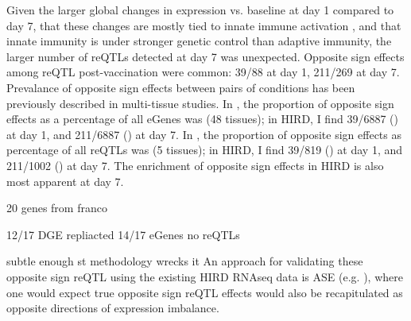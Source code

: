 Given the larger  global changes in expression vs. baseline at day 1 compared to day 7, 
that these changes are mostly tied to innate immune activation ,
and that innate immunity is under stronger genetic control than adaptive immunity\autocite{patin2018NaturalVariationParameters},
the larger number of \glspl{reQTL} detected at day 7 was unexpected.
Opposite sign effects among \gls{reQTL} post-vaccination were common: 39/88 at day 1, 211/269 at day 7.
Prevalance of opposite sign effects between pairs of conditions has been previously described in multi-tissue studies.
In \autocite{mizuno2019BiologicalCharacterizationExpression}, the proportion of opposite sign effects as a percentage of all eGenes was  (48 tissues);
in \gls{HIRD}, I find
39/6887 () at day 1,
and 211/6887 () at day 7.
In \autocite{fu2012UnravelingRegulatoryMechanisms}, the proportion of opposite sign effects as percentage of all reQTLs was  (5 tissues);
in \gls{HIRD}, I find
39/819 () at day 1,
and 211/1002 () at day 7.
The enrichment of opposite sign effects in \gls{HIRD} is also most apparent at day 7.

20 genes from franco

12/17 DGE repliacted
14/17 eGenes
no reQTLs

subtle enough st methodology wrecks it
An approach for validating these opposite sign \gls{reQTL} using the existing \gls{HIRD} \gls{RNAseq} data is \gls{ASE} (e.g. \autocite{kumasaka2016FinemappingCellularQTLs}),
where one would expect true opposite sign \gls{reQTL} effects would also be recapitulated as opposite directions of expression imbalance.

